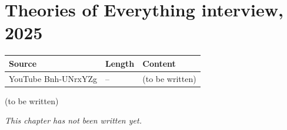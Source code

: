 \chapter{Theories of Everything interview, 2025}\label{ch:c33}
\begin{paracol}{2}

\begin{sources}
\begin{tabularx}{\linewidth}{@{}l l L@{}}
\toprule
\textbf{Source} & \textbf{Length} & \textbf{Content}\\
\midrule
YouTube Bnh-UNrxYZg & -- & (to be written)\\
\bottomrule
\end{tabularx}

\end{sources}

\begin{reading}
(to be written)
\end{reading}

\emph{This chapter has not been written yet.}

\flushside
\end{paracol}
